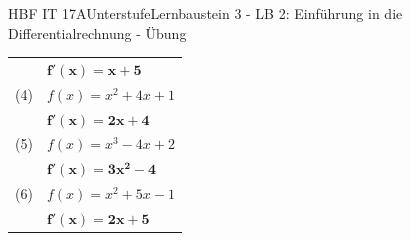 \documentclass[oneside,openany,headings=optiontotoc,11pt,numbers=noenddot]{scrreprt}
\begin{document}
\begin{worksheet}{HBF IT 17A}{Unterstufe}{Lernbaustein 3 - LB 2: Einführung in die Differentialrechnung - Übung}
\begin{framed}
\begin{tabularx}{\textwidth}{lX}
				& \(\mathbf{f'(x) = x + 5}\)\\
				(4) & \(f(x) = x^2 + 4x +1\)\\
				& \(\mathbf{f'(x) = 2x +4}\)\\
				(5) & \(f(x) = x^3-4x+2\)\\
				& \(\mathbf{f'(x) = 3x^2 -4}\)\\
				(6) & \(f(x) = x^2+5x-1\)\\
				& \(\mathbf{f'(x) = 2x + 5}\)
			\end{tabularx}
		\end{framed}
	\end{worksheet}
\end{document}
